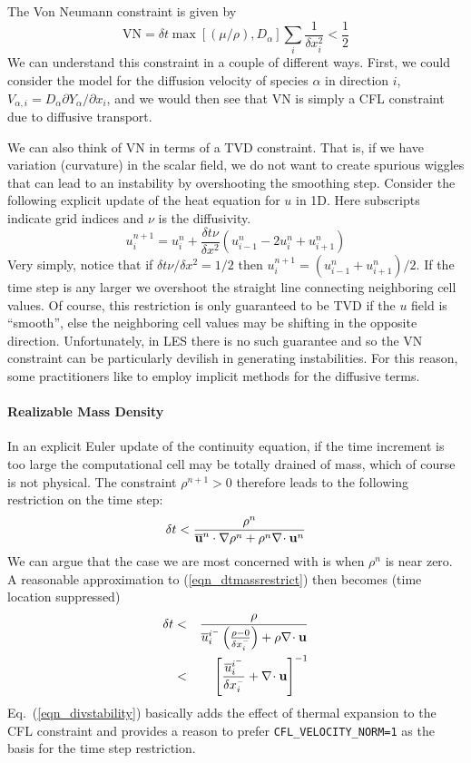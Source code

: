 \documentclass[11pt]{article}
\begin{document}
The Von Neumann constraint is given by
\begin{equation}
\mbox{VN} = \delta t \max[(\mu/\rho),D_\alpha] \sum_i \frac{1}{\delta x_i^2} < \frac{1}{2}
\end{equation}
We can understand this constraint in a couple of different ways.  First, we could consider the model for the diffusion velocity of species $\alpha$ in direction $i$, $V_{\alpha,i} = D_\alpha \partial Y_\alpha/\partial x_i$, and we would then see that VN is simply a CFL constraint due to diffusive transport.

We can also think of VN in terms of a TVD constraint.  That is, if we have variation (curvature) in the scalar field, we do not want to create spurious wiggles that can lead to an instability by overshooting the smoothing step.  Consider the following explicit update of the heat equation for $u$ in 1D. Here subscripts indicate grid indices and $\nu$ is the diffusivity.
\begin{equation}
u_i^{n+1} = u_i^n + \frac{\delta t \nu}{\delta x^2} (u_{i-1}^n - 2u_i^n + u_{i+1}^n )
\end{equation}
Very simply, notice that if $\delta t \nu/\delta x^2 = 1/2$ then $u_i^{n+1} = (u_{i-1}^n + u_{i+1}^n)/2$.  If the time step is any larger we overshoot the straight line connecting neighboring cell values.  Of course, this restriction is only guaranteed to be TVD if the $u$ field is ``smooth'', else the neighboring cell values may be shifting in the opposite direction.  Unfortunately, in LES there is no such guarantee and so the VN constraint can be particularly devilish in generating instabilities. For this reason, some practitioners like to employ implicit methods for the diffusive terms.

\paragraph{Realizable Mass Density}

In an explicit Euler update of the continuity equation, if the time increment is too large the computational cell may be totally drained of mass, which of course is not physical. The constraint $\rho^{n+1}>0$ therefore leads to the following restriction on the time step:
\begin{equation}
\label{eqn_dtmassrestrict}
\delta t < \frac{\rho^n}{\overline{\mathbf{u}}^n\cdot\nabla\rho^n + \rho^n \nabla\!\cdot\mathbf{u}^n}
\end{equation}
We can argue that the case we are most concerned with is when $\rho^n$ is near zero.  A reasonable approximation to (\ref{eqn_dtmassrestrict}) then becomes (time location suppressed)
\begin{eqnarray}
\label{eqn_divstability}
\delta t &<& \frac{\rho}{\overline{u}_i^{i^{\scriptscriptstyle -}} \left(\frac{\rho-0}{\delta x_i^{\scriptscriptstyle -}}\right) + \rho \nabla\!\cdot\mathbf{u}} \nonumber\\
&<& \left[ \frac{\overline{u}_i^{i^{\scriptscriptstyle -}}}{\delta x_i^{\scriptscriptstyle -}} + \nabla\!\cdot\mathbf{u} \right]^{-1}
\end{eqnarray}
Eq.~(\ref{eqn_divstability}) basically adds the effect of thermal expansion to the CFL constraint and provides a reason to prefer {\tt CFL\_VELOCITY\_NORM=1} as the basis for the time step restriction.
\end{document}
